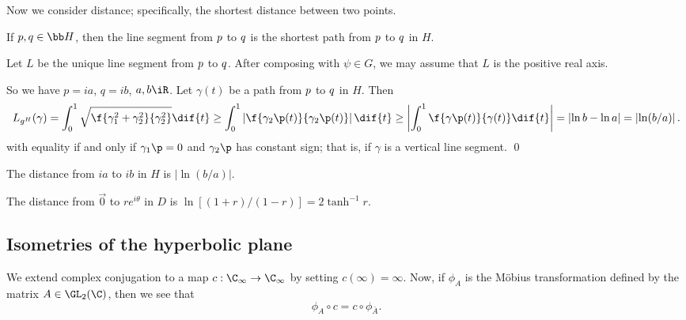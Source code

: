 	\pagebreak

Now we consider distance; specifically, the shortest distance between two points.

\begin{proposition}
	If $p,q\iH$, then the line segment from $p$ to $q$ is the shortest path from $p$ to $q$ in $H$.
\end{proposition}

\begin{proof*}
	[In $H$] Let $L$ be the unique line segment from $p$ to $q$. After composing with $\psi\in G$, we may assume that $L$ is the positive real axis.

	So we have $p=ia$, $q=ib$, $a,b\iR$.  Let $\gamma(t)$ be a path from $p$ to $q$ in $H$. Then
	\begin{equation*}
		L_{g^H}(\gamma)
		= \int_0^1 \sqrt{\f{\gamma_1^2+\gamma_2^2}{\gamma_2^2}} \dif{t}
		\geq \int_0^1 \left\vert \f{\gamma_2\p(t)}{\gamma_2\p(t)} \right\vert \dif{t}
		\geq \left\vert \int_0^1 \f{\gamma\p(t)}{\gamma(t)} \dif{t} \right\vert
		= \left\vert \ln b - \ln a \right\vert
		= \left\vert \ln(b/a) \right\vert.
	\end{equation*}
	with equality if and only if $\gamma_1\p=0$ and $\gamma_2\p$ has constant sign; that is, if $\gamma$ is a vertical line segment. \qed
\end{proof*}

\begin{corollary}
	The distance from $ia$ to $ib$ in $H$ is $\left\vert \ln(b/a) \right\vert$.
\end{corollary}

\begin{corollary}
	The distance from $\vec{0}$ to $re^{i\theta}$ in $D$ is $\ln\left[ (1+r)/(1-r) \right] = 2\tanh^{-1} r$.
\end{corollary}


\subsection{Isometries of the hyperbolic plane} %
\label{sub:isometries_of_the_hyperbolic_plane}

We extend complex conjugation to a map $c:\C_\infty \to \C_\infty$ by setting $c(\infty) = \infty$. Now, if $\phi_A$ is the Möbius transformation defined by the matrix $A\in\GL_2(\C)$, then we see that
\begin{equation*}
	\phi_A \circ c = c \circ \phi_{\bar{A}}.
\end{equation*}

